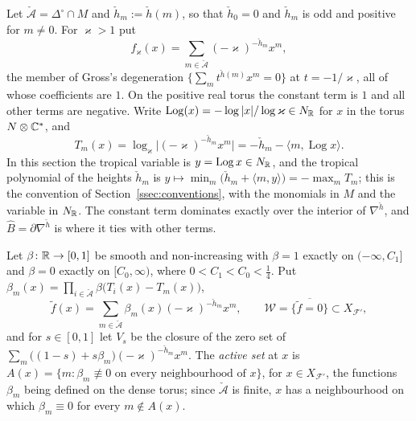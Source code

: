 Let $\check{\mathcal A}=\Delta^\circ\cap M$ and $\check h_m:=\check h(m)$, so that $\check h_0=0$ and $\check h_m$ is odd and
positive for $m\neq0$. For $\varkappa>1$ put
\[
f_\varkappa(x)=\sum_{m\in\check{\mathcal A}}(-\varkappa)^{-\check h_m}x^m ,
\]
the member of Gross's degeneration $\{\sum_mt^{\check h(m)}x^m=0\}$ at $t=-1/\varkappa$, all of whose coefficients are $1$. On the
positive real torus the constant term is $1$ and all other terms are negative. Write
$\operatorname{Log}(x)=-\log|x|/\log \varkappa\in N_\mathbb R$ for $x$ in the torus $N\otimes\mathbb C^*$, and
\[
T_m(x)=\log_\varkappa\bigl|(-\varkappa)^{-\check h_m}x^m\bigr|=-\check h_m-\langle m,\operatorname{Log}x\rangle .
\]
In this section the tropical variable is $y=\operatorname{Log}x\in N_\mathbb R$, and the tropical polynomial of the heights
$\check h_m$ is $y\mapsto\min_m\bigl(\check h_m+\langle m,y\rangle\bigr)=-\max_mT_m$; this is the convention of
Section~\ref{ssec:conventions}, with the monomials in $M$ and the variable in $N_\mathbb R$. The constant term dominates exactly over
the interior of $\nabla^{\check h}$, and $\widehat B=\partial\nabla^{\check h}$ is where it ties with other terms.

\begin{definition}\label{def:W}
Let $\beta\colon\mathbb R\to[0,1]$ be smooth and non-increasing with $\beta=1$ exactly on $(-\infty,C_1]$ and $\beta=0$ exactly on
$[C_0,\infty)$, where $0<C_1<C_0<\frac14$. Put $\beta_m(x)=\prod_{i\in\check{\mathcal A}}\beta\bigl(T_i(x)-T_m(x)\bigr)$,
\[
\tilde f(x)=\sum_{m\in\check{\mathcal A}}\beta_m(x)(-\varkappa)^{-\check h_m}x^m ,\qquad \mathscr W=\overline{\{\tilde f=0\}}\subset X_{\mathcal F'} ,
\]
and for $s\in[0,1]$ let $V_s$ be the closure of the zero set of
$\sum_m\bigl((1-s)+s\beta_m\bigr)(-\varkappa)^{-\check h_m}x^m$. The \emph{active set} at $x$ is
$A(x)=\{m:\beta_m\not\equiv0\text{ on every neighbourhood of }x\}$, for $x\in X_{\mathcal F'}$, the functions $\beta_m$ being
defined on the dense torus; since $\check{\mathcal A}$ is finite, $x$ has a
neighbourhood on which $\beta_m\equiv0$ for every $m\notin A(x)$.
\end{definition}

